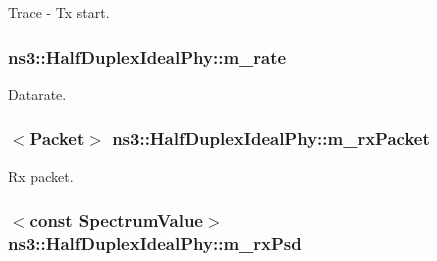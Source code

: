 Trace -\/ Tx start. 

\subsubsection[{\texorpdfstring{m\+\_\+rate}{m_rate}}]{ ns3\+::\+Half\+Duplex\+Ideal\+Phy\+::m\+\_\+rate\hspace{0.3cm}{\ttfamily [private]}}\hypertarget{classns3_1_1HalfDuplexIdealPhy_aa01f82bb346c8d25dbfbf9da2217f09f}{}\label{classns3_1_1HalfDuplexIdealPhy_aa01f82bb346c8d25dbfbf9da2217f09f}


Datarate. 

\subsubsection[{\texorpdfstring{m\+\_\+rx\+Packet}{m_rxPacket}}]{$<${\bf Packet}$>$ ns3\+::\+Half\+Duplex\+Ideal\+Phy\+::m\+\_\+rx\+Packet\hspace{0.3cm}{\ttfamily [private]}}\hypertarget{classns3_1_1HalfDuplexIdealPhy_aa1122da72d7425d4bebb0cd65d442db1}{}\label{classns3_1_1HalfDuplexIdealPhy_aa1122da72d7425d4bebb0cd65d442db1}


Rx packet. 

\subsubsection[{\texorpdfstring{m\+\_\+rx\+Psd}{m_rxPsd}}]{$<$const {\bf Spectrum\+Value}$>$ ns3\+::\+Half\+Duplex\+Ideal\+Phy\+::m\+\_\+rx\+Psd\hspace{0.3cm}{\ttfamily [private]}}\hypertarget{classns3_1_1HalfDuplexIdealPhy_a17dfdb0350a690c50953deb78318025e}{}\label{classns3_1_1HalfDuplexIdealPhy_a17dfdb0350a690c50953deb78318025e}


